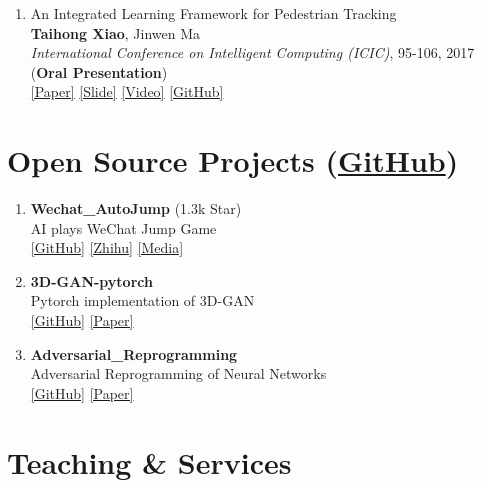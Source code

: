 \documentclass[letterpaper]{article}
\begin{document}
\begin{enumerate}
\item An Integrated Learning Framework for Pedestrian Tracking\\
	{\bf Taihong Xiao}, Jinwen Ma\\
	{\it International Conference on Intelligent Computing (ICIC)}, 95-106, 2017 ({\bf Oral Presentation})\\
	\href{https://link.springer.com/chapter/10.1007\%2F978-3-319-63315-2_9}{[Paper]}
	\href{https://prinsphield.github.io/extra/ICIC-20170808.pdf}{[Slide]}
	\href{https://youtu.be/HQIi0Z9b4Pw}{[Video]}
	\href{https://github.com/Prinsphield/ILFPT}{[GitHub]}

\end{enumerate}



\section*{Open Source Projects (\href{https://github.com/Prinsphield}{GitHub})}

\begin{enumerate}

\item {\bf Wechat\_AutoJump} (1.3k Star)\\
	AI plays WeChat Jump Game \\
	\href{https://github.com/Prinsphield/Wechat_AutoJump}{[GitHub]}
	\href{https://zhuanlan.zhihu.com/p/32636329}{[Zhihu]}
	\href{https://www.jiqizhixin.com/articles/2018-01-06-9}{[Media]}

\item {\bf 3D-GAN-pytorch}\\
	Pytorch implementation of 3D-GAN \\
	\href{https://github.com/Prinsphield/3D-GAN-pytorch}{[GitHub]}
	\href{http://3dgan.csail.mit.edu/papers/3dgan_nips.pdf}{[Paper]}

\item {\bf Adversarial\_Reprogramming}\\
	Adversarial Reprogramming of Neural Networks \\
	\href{https://github.com/Prinsphield/Adversarial_Reprogramming}{[GitHub]}
	\href{https://arxiv.org/abs/1806.11146}{[Paper]}

\end{enumerate}




\section*{Teaching \& Services}
\end{document}
